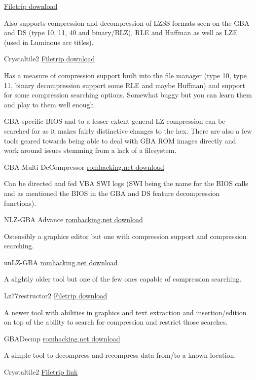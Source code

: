 \documentclass[
]{book}
\begin{document}
\href{http://filetrip.net/nds-downloads/utilities/download-cues-gba-ds-compressors-10-f29010.html}{Filetrip download}

Also supports compression and decompression of LZSS formats seen on the GBA and DS (type 10, 11, 40 and binary/BLZ), RLE and Huffman as well as LZE (used in Luminous arc titles).

Crystaltile2 \href{http://filetrip.net/f23649-CrystalTile2-2010-09-06.html}{Filetrip download}

Has a measure of compression support built into the file manager (type 10, type 11, binary decompression support some RLE and maybe Huffman) and support for some compression searching options. Somewhat buggy but you can learn them and play to them well enough.

GBA specific BIOS and to a lesser extent general LZ compression can be searched for as it makes fairly distinctive changes to the hex. There are also a few tools geared towards being able to deal with GBA ROM images directly and work around issues stemming from a lack of a filesystem.

GBA Multi DeCompressor \href{http://www.romhacking.net/utilities/431/}{romhacking.net download}

Can be directed and fed VBA SWI logs (SWI being the name for the BIOS calls and as mentioned the BIOS in the GBA and DS feature decompression functions).

NLZ-GBA Advance \href{http://www.romhacking.net/utilities/529/}{romhacking.net download}

Ostensibly a graphics editor but one with compression support and compression searching.

unLZ-GBA \href{http://www.romhacking.net/utilities/362/}{romhacking.net download}

A slightly older tool but one of the few ones capable of compression searching.

Lz77restructor2 \href{http://filetrip.net/gba-downloads/tools-utilities/latest-lz77restructor2-f29641.html}{Filetrip download}

A newer tool with abilities in graphics and text extraction and insertion/edition on top of the ability to search for compression and restrict those searches.

GBADecmp \href{http://www.romhacking.net/utilities/433/}{romhacking.net download}

A simple tool to decompress and recompress data from/to a known location.

Crystaltile2 \href{http://filetrip.net/f23649-CrystalTile2-2010-09-06.html}{Filetrip link}
\end{document}
